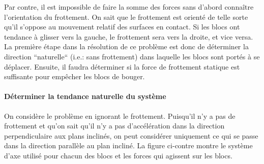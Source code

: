 \documentclass{tufte-handout}
\begin{document}
Par contre, il est impossible de faire la somme des forces sans d'abord
connaître l'orientation du frottement.  On sait que le frottement est orienté
de telle sorte qu'il s'oppose au mouvement relatif des surfaces en contact.  Si
les blocs ont tendance à glisser vers la gauche, le frottement sera vers la
droite, et vice versa.  La première étape dans la résolution de ce problème est
donc de déterminer la direction ``naturelle`` (i.e.: sans frottement) dans
laquelle les blocs sont portés à se déplacer.  Ensuite, il faudra déterminer si
la force de frottement statique est suffisante pour empêcher les blocs de
bouger.

\paragraph{Déterminer la tendance naturelle du système}

On considère le problème en ignorant le frottement.  Puisqu'il n'y a pas de
frottement et qu'on sait qu'il n'y a pas d'accélération dans la direction
perpendiculaire aux plans inclinés, on peut considérer uniquement ce qui se
passe dans la direction parallèle au plan incliné.  La figure ci-contre montre
le système d'axe utilisé pour chacun des blocs et les forces qui agissent sur
les blocs.

\begin{marginfigure}
\end{marginfigure}
\end{document}
